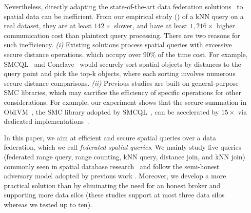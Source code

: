 Nevertheless, directly adapting the state-of-the-art data federation solutions~\cite{vldb17smcql, eurosys19conclave} to spatial data can be inefficient.
From our empirical study () of a kNN query on a real dataset, they are at least $142 \times$ slower, and have at least $1,216\times$ higher communication cost than plaintext query processing.
There are two reasons for such inefficiency.
\textit{(i)}
Existing solutions process spatial queries with excessive secure distance operations, which occupy over 90\% of the time cost.
For example, SMCQL~\cite{vldb17smcql} and Conclave~\cite{eurosys19conclave} would securely sort spatial objects by distances to the query point and pick the top-k objects, where each sorting involves numerous secure distance comparisons.
\textit{(ii)}
Previous studies \cite{vldb17smcql,eurosys19conclave} are built on general-purpose SMC libraries, which may sacrifice the efficiency of specific operations for other considerations.
For example, our experiment shows that the secure summation in ObliVM~\cite{DBLP:conf/sp/LiuWNHS15}, the SMC library adopted by SMCQL~\cite{vldb17smcql}, can be accelerated by $15\times$ via dedicated implementations~\cite{DBLP:journals/dke/EmekciSAA07}.

In this paper, we aim at efficient and secure spatial queries over a data federation, which we call \textit{federated spatial queries}.
We mainly study five queries (federated range query, range counting, kNN query, distance join, and kNN join) commonly seen in spatial database research~\cite{sigmod16simba,icde15spatialhadoop} and follow the semi-honest adversary model adopted by previous work \cite{vldb17smcql, eurosys19conclave, DBLP:conf/sigmod/Wang021}.
Moreover, we develop a more practical solution than \cite{vldb17smcql, eurosys19conclave} by eliminating the need for an honest broker and supporting more data silos (these studies support at most three data silos whereas we tested up to ten).

